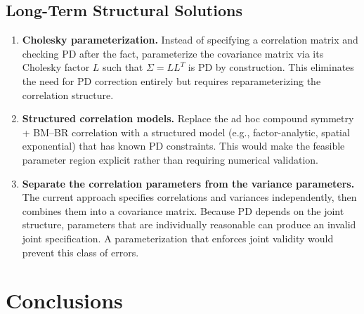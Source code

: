 \documentclass[11pt]{article}
\begin{document}
\subsection{Long-Term Structural Solutions}

\begin{enumerate}
\item \textbf{Cholesky parameterization.} Instead of specifying
  a correlation matrix and checking PD after the fact,
  parameterize the covariance matrix via its Cholesky factor
  $L$ such that $\Sigma = LL^T$ is PD by construction. This
  eliminates the need for PD correction entirely but requires
  reparameterizing the correlation structure.

\item \textbf{Structured correlation models.} Replace the
  ad hoc compound symmetry + BM--BR correlation with a
  structured model (e.g., factor-analytic, spatial
  exponential) that has known PD constraints. This would
  make the feasible parameter region explicit rather than
  requiring numerical validation.

\item \textbf{Separate the correlation parameters from the
  variance parameters.} The current approach specifies
  correlations and variances independently, then combines
  them into a covariance matrix. Because PD depends on the
  joint structure, parameters that are individually reasonable
  can produce an invalid joint specification. A parameterization
  that enforces joint validity would prevent this class of
  errors.
\end{enumerate}

\section{Conclusions}
\end{document}
